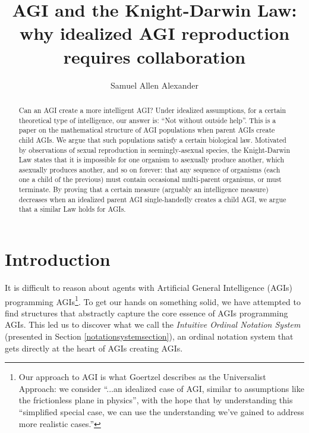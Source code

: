 \documentclass[runningheads]{llncs}
\begin{document}
\title{AGI and the Knight-Darwin Law: why idealized AGI reproduction requires
collaboration}

\author{Samuel Allen Alexander}

\maketitle

\begin{abstract}
Can an AGI create a more intelligent AGI?
Under idealized assumptions, for a certain theoretical
type of intelligence, our answer is:
``Not without outside help''.
This is a paper on the mathematical structure of AGI populations
when parent AGIs create child AGIs. We argue that such populations
satisfy a certain biological law.
Motivated by observations of sexual reproduction in seemingly-asexual
species,
the Knight-Darwin Law states that it is impossible for one organism
to asexually produce another, which asexually produces another,
and so on forever:
that any sequence of organisms (each one a child of the previous) must contain
occasional multi-parent organisms, or must terminate.
By proving that a certain measure (arguably an intelligence measure)
decreases when an
idealized parent AGI single-handedly creates a child AGI,
we argue that a similar Law holds for AGIs.


\end{abstract}

\section{Introduction}

It is difficult to reason about agents with Artificial General Intelligence (AGIs)
programming AGIs\footnote{Our approach to AGI is what
Goertzel \cite{goertzel2014artificial} describes
as the Universalist Approach:
we consider ``...an idealized case of AGI, similar to
assumptions like the frictionless plane in physics'', with the hope that by
understanding this ``simplified special
case, we can use the understanding we've gained to address more realistic
cases.''}. To get our hands on something solid,
we have attempted to find structures that abstractly capture the core essence of
AGIs programming AGIs. This led us to discover
what we call the \emph{Intuitive Ordinal Notation System} (presented in Section
\ref{notationsystemsection}), an ordinal notation system that gets directly at
the heart of AGIs creating AGIs.
\end{document}
